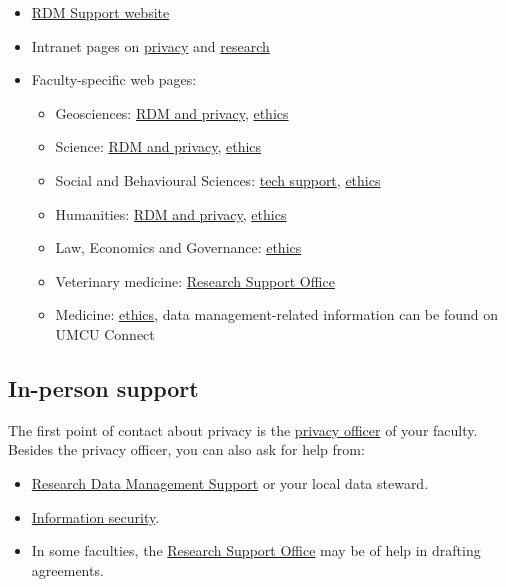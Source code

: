 \documentclass[
]{book}
\providecommand{\tightlist}{%
  \setlength{\itemsep}{0pt}\setlength{\parskip}{0pt}}
\begin{document}
\begin{itemize}
\tightlist
\item
  \href{https://www.uu.nl/rdm}{RDM Support website}
\item
  Intranet pages on \href{https://intranet.uu.nl/en/knowledge-base/privacy-at-uu}{privacy} and
  \href{https://intranet.uu.nl/en/knowledgebase/research}{research}
\item
  Faculty-specific web pages:

  \begin{itemize}
  \tightlist
  \item
    Geosciences: \href{https://geo-data-support.sites.uu.nl/}{RDM and privacy},
    \href{https://sciencegeo-erb.sites.uu.nl/}{ethics}
  \item
    Science: \href{https://science-data-support.sites.uu.nl/}{RDM and privacy},
    \href{https://sciencegeo-erb.sites.uu.nl/}{ethics}
  \item
    Social and Behavioural Sciences: \href{https://techsupport.fss.uu.nl/}{tech support},
    \href{https://ferb.sites.uu.nl/}{ethics}
  \item
    Humanities: \href{https://cdh.uu.nl/research/data-management-privacy/}{RDM and privacy},
    \href{https://fetc-gw.wp.hum.uu.nl/}{ethics}
  \item
    Law, Economics and Governance: \href{https://intranet.uu.nl/en/knowledgebase/facultys-ethical-review-committee}{ethics}
  \item
    Veterinary medicine: \href{https://www.uu.nl/en/node/589/onderzoeksbureauresearch-support-office}{Research Support Office}
  \item
    Medicine: \href{https://www.metc-utrecht.nl/en/}{ethics}, data management-related information can be found on UMCU Connect
  \end{itemize}
\end{itemize}

\hypertarget{support}{%
\subsection{In-person support}\label{support}}

The first point of contact about privacy is the \href{https://intranet.uu.nl/en/knowledgebase/privacyofficers}{privacy officer}
of your faculty. Besides the privacy officer, you can also ask for help from:

\begin{itemize}
\tightlist
\item
  \href{https://www.uu.nl/en/research/research-data-management/contact-us}{Research Data Management Support}
  or your local data steward.
\item
  \href{https://intranet.uu.nl/en/security/information-security-contact-who-are-we}{Information security}.
\item
  In some faculties, the \href{https://intranet.uu.nl/en/knowledgebase/research-support-offices}{Research Support Office}
  may be of help in drafting agreements.
\end{itemize}
\end{document}
